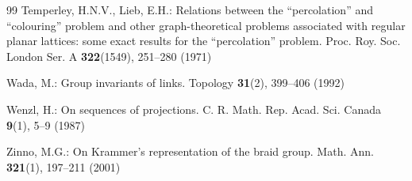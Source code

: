 \documentclass[11pt]{article}
\theoremstyle{definition}
\theoremstyle{remark}
\begin{document}
\begin{thebibliography}{99}
Temperley, H.N.V., Lieb, E.H.: Relations between the ``percolation'' and
``colouring'' problem and other graph-theoretical problems associated
with regular planar lattices: some exact results for the ``percolation''
problem. Proc. Roy. Soc. London Ser. A \textbf{322}(1549), 251--280
(1971)

Wada, M.: Group invariants of links. Topology \textbf{31}(2), 399--406
(1992)

Wenzl, H.: On sequences of projections. C. R. Math. Rep. Acad. Sci.
Canada \textbf{9}(1), 5--9 (1987)

Zinno, M.G.: On Krammer's representation of the braid group. Math. Ann.
\textbf{321}(1), 197--211 (2001)

\end{thebibliography}
\end{document}
